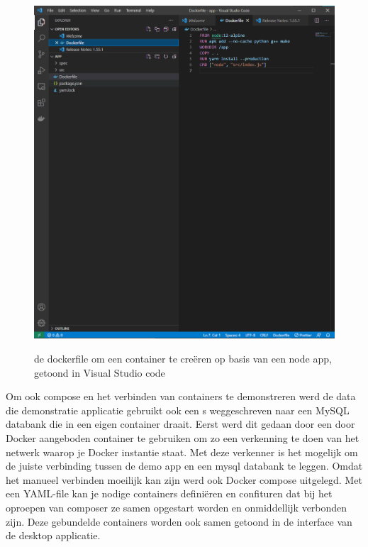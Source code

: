 \begin{figure}[h]
    \includegraphics[width=\linewidth]{img/dockerSample.png}
    \label{fig:dockerfilevscode}
    \caption[Een dockerfile in VS code]{de dockerfile om een container  te creëren op basis van een node app, getoond in Visual Studio code}
    \centering
\end{figure}


Om ook compose en het verbinden van containers te demonstreren werd de data die demonstratie applicatie gebruikt ook een s weggeschreven naar een MySQL databank die in een eigen container draait. Eerst werd dit gedaan door een door Docker aangeboden container te gebruiken om zo een verkenning te doen van het netwerk waarop je Docker instantie staat. Met deze verkenner is het mogelijk om de juiste verbinding tussen de demo app en een mysql databank te leggen. Omdat het manueel verbinden moeilijk kan zijn werd ook Docker compose uitgelegd. Met een YAML-file kan je nodige containers definiëren en confituren dat bij het oproepen van composer ze samen opgestart worden en onmiddellijk verbonden zijn. Deze gebundelde containers worden ook samen getoond in de interface van de desktop applicatie.


